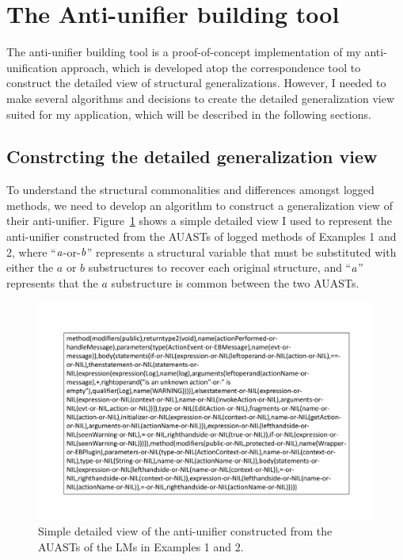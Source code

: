 \section{The Anti-unifier building tool} \label{antiunifierTool}
The anti-unifier building tool is a proof-of-concept implementation of my anti-unification approach, which is developed atop the correspondence tool to construct the detailed view of structural generalizations. However, I needed to make several algorithms and decisions to create the detailed generalization view suited for my application, which will be described in the following sections.


\subsection{Constrcting the detailed generalization view} \label{meth-detailed-view}
To understand the structural commonalities and differences amongst logged methods, we need to develop an algorithm to construct a generalization view of their anti-unifier. Figure~\ref{fig:meth-anti-unifier} shows a simple detailed view I used to represent the anti-unifier constructed from the AUASTs of logged methods of Examples 1 and 2, where ``$\mathit{a}$-or-$\mathit{b}$'' represents a structural variable that must be substituted with either the $a$ or $b$ substructures to recover each original structure, and ``$\mathit{a}$'' represents that the $a$ substructure is common between the two AUASTs.




\begin{figure} [H]
  \centering\includegraphics [scale=0.5]{Drawing4/auMethod.pdf}
  \caption{Simple detailed view of the anti-unifier constructed from the AUASTs of the LMs in Examples 1 and 2.}
  \label{fig:meth-anti-unifier}
\end{figure}

